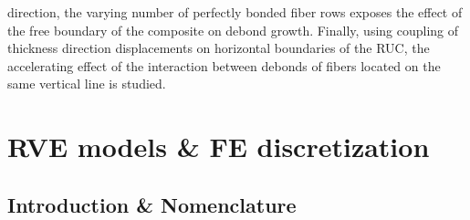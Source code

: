 \documentclass[review]{elsarticle}
\begin{document}
direction, the varying number of perfectly bonded fiber rows exposes the effect of the free boundary of the composite on debond growth. Finally, using coupling of thickness direction displacements on horizontal boundaries of the RUC, the accelerating effect of the interaction between debonds of fibers located on the same vertical line is studied.

\section{RVE models \& FE discretization}

\subsection{Introduction \& Nomenclature}\label{subsec:names}
\end{document}
